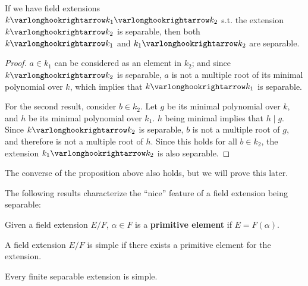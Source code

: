 \begin{proposition}\label{prop: transitivity of separable extensions, backwards}
    If we have field extensions $k \ext k_1 \ext k_2$ s.t. the extension $k \ext k_2$ is separable, then both $k \ext k_1$ and $k_1 \ext k_2$ are separable. 
\end{proposition}

\begin{proof}
    $a \in k_1$ can be considered as an element in $k_2$; and since $k \ext k_2$ is separable, $a$ is not a multiple root of its minimal polynomial over $k$, which implies that $k \ext k_1$ is separable. 

    For the second result, consider $b \in k_2$. Let $g$ be its minimal polynomial over $k$, and $h$ be its minimal polynomial over $k_1$. $h$ being minimal implies that $h \mid g$. Since $k \ext k_2$ is separable, $b$ is not a multiple root of $g$, and therefore is not a multiple root of $h$. Since this holds for all $b \in k_2$, the extension $k_1 \ext k_2$ is also separable.
\end{proof}

\textstart
The converse of the proposition above also holds, but we will prove this later.

The following results characterize the ``nice'' feature of a field extension being separable:

\begin{definition}
    Given a field extension $E/F$, $\alpha \in F$ is a \textbf{primitive element} if $E = F(\alpha)$.
\end{definition}
\nogap
\begin{definition}
    A field extension $E/F$ is simple if there exists a primitive element for the extension.
\end{definition}

\begin{theorem}\label{thm: primitive element theorem}
    Every finite separable extension is simple. 
\end{theorem}

